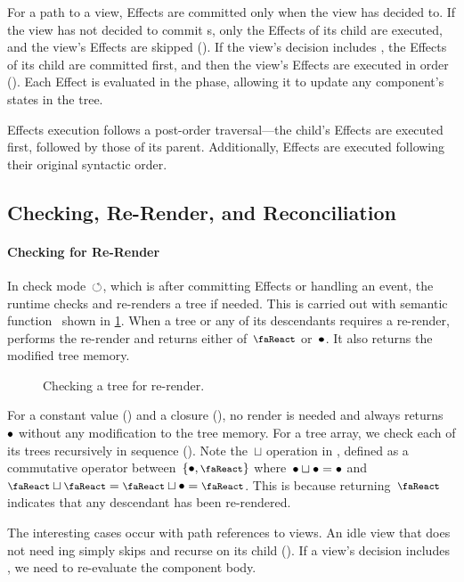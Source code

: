 For a path to a view, Effects are committed only when the view has decided to.
If the view has not decided to commit s, only the Effects of its child are executed, and the view's Effects are skipped ().
If the view's decision includes , the Effects of its child are committed first, and then the view's Effects are executed in order ().
Each Effect is evaluated in the  phase, allowing it to update any component's states in the tree.

Effects execution follows a post-order traversal---the child's Effects are executed first, followed by those of its parent.
Additionally, Effects are executed following their original syntactic order.


\subsection{Checking, Re-Render, and Reconciliation}\label{subsec:reconciliation}
\paragraph{Checking for Re-Render}
In check mode~$\circlearrowleft$, which is after committing Effects or handling an event, the runtime checks and re-renders a tree if needed.
This is carried out with semantic function~ shown in \cref{fig:check}.
When a tree or any of its descendants requires a re-render,  performs the re-render and returns either of~$\rendermode$ or~$\bullet$.
It also returns the modified tree memory.
\begin{figure}[t]
  \centering
  
  \caption{Checking a tree for re-render.}\label{fig:check}
\end{figure}

For a constant value () and a closure (), no render is needed and  always returns~$\bullet$ without any modification to the tree memory.
For a tree array, we check each of its trees recursively in sequence ().
Note the~$\sqcup$ operation in , defined as a commutative operator between~$\{\eloopmode, \rendermode\}$ where~$\bullet \sqcup \bullet = \bullet$ and $\rendermode \sqcup \rendermode = \rendermode \sqcup \eloopmode = \rendermode$.
This is because returning~$\rendermode$ indicates that any descendant has been re-rendered.

The interesting cases occur with path references to views.
An idle view that does not need ing simply skips and recurse on its child ().
If a view's decision includes , we need to re-evaluate the component body.

